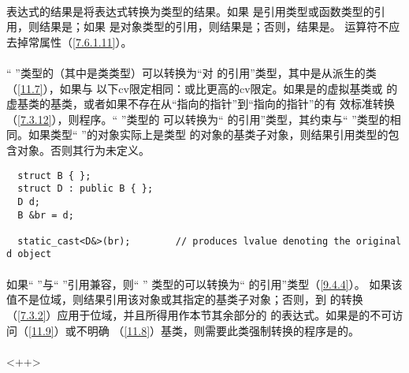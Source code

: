 \paragraph{} %
表达式的结果是将表达式转换为类型的结果。如果
是\lvalue{}引用类型或函数类型的\rvalue{}引用，则结果是\lvalue{}；如果
是对象类型的\rvalue{}引用，则结果是\xvalue{}；否则，结果是\prvalue{}。
运算符不应去掉常属性（\ref{7.6.1.11}）。

\paragraph{} %
`` ''类型的\lvalue{}（其中是类类型）可以转换为``对
的引用''类型，其中是从派生的类（\ref{11.7}），如果与
以下cv限定相同：或比更高的cv限定。如果是的虚拟基类或
的虚基类的基类，或者如果不存在从``指向的指针''到``指向的指针''的有
效标准转换（\ref{7.3.12}），则程序\illform{}。`` ''类型的
\xvalue{}可以转换为`` 的\rvalue{}引用''类型，其约束与``
''类型的\lvalue{}相同。如果类型`` ''的对象实际上是类型
的对象的基类子对象，则结果引用类型的包含对象。否则其行为未定义。

\begin{example}
  \begin{lstlisting}
  struct B { };
  struct D : public B { };
  D d;
  B &br = d;

  static_cast<D&>(br);        // produces lvalue denoting the original d object
  \end{lstlisting}
\end{example}

\paragraph{} %
如果`` ''与`` ''引用兼容，则`` ''
类型的\lvalue{}可以转换为`` 的\rvalue{}引用''类型（\ref{9.4.4}）。
如果该值不是位域，则结果引用该对象或其指定的基类子对象；否则，\lvalue{}到
\rvalue{}的转换（\ref{7.3.2}）应用于位域，并且所得\prvalue{}用作本节其余部分的
的表达式。如果是的不可访问（\ref{11.9}）或不明确
（\ref{11.8}）基类，则需要此类强制转换的程序是\illform{}的。

\paragraph{} %
<++>

